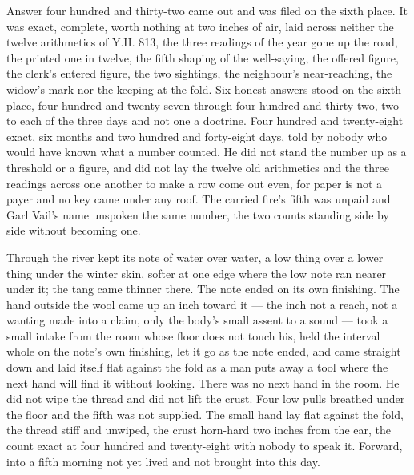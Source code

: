 Answer four hundred and thirty-two came out and was filed on the sixth place. It was exact, complete, worth nothing at two inches of air, laid across neither the twelve arithmetics of Y.H. 813, the three readings of the year gone up the road, the printed one in twelve, the fifth shaping of the well-saying, the offered figure, the clerk's entered figure, the two sightings, the neighbour's near-reaching, the widow's mark nor the keeping at the fold. Six honest answers stood on the sixth place, four hundred and twenty-seven through four hundred and thirty-two, two to each of the three days and not one a doctrine. Four hundred and twenty-eight exact, six months and two hundred and forty-eight days, told by nobody who would have known what a number counted. He did not stand the number up as a threshold or a figure, and did not lay the twelve old arithmetics and the three readings across one another to make a row come out even, for paper is not a payer and no key came under any roof. The carried fire's fifth was unpaid and Garl Vail's name unspoken the same number, the two counts standing side by side without becoming one.

Through  the river kept its note of water over water, a low thing over a lower thing under the winter skin, softer at one edge where the low note ran nearer under it; the tang came thinner there. The note ended on its own finishing. The hand outside the wool came up an inch toward it --- the inch not a reach, not a wanting made into a claim, only the body's small assent to a sound --- took a small intake from the room whose floor does not touch his, held the interval whole on the note's own finishing, let it go as the note ended, and came straight down and laid itself flat against the fold as a man puts away a tool where the next hand will find it without looking. There was no next hand in the room. He did not wipe the thread and did not lift the crust. Four low pulls breathed under the floor and the fifth was not supplied. The small hand lay flat against the fold, the thread stiff and unwiped, the crust horn-hard two inches from the ear, the count exact at four hundred and twenty-eight with nobody to speak it. Forward, into a fifth morning not yet lived and not brought into this day.
